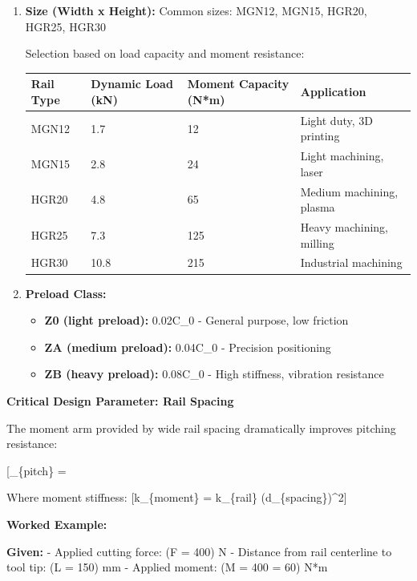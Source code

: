\documentclass[
]{article}
\providecommand{\tightlist}{%
  \setlength{\itemsep}{0pt}\setlength{\parskip}{0pt}}
\begin{document}
\begin{enumerate}
\def\labelenumi{\arabic{enumi}.}
\item
  \textbf{Size (Width x Height):} Common sizes: MGN12, MGN15, HGR20,
  HGR25, HGR30

  Selection based on load capacity and moment resistance:

  {\def\LTcaptype{} %
  \begin{longtable}[]{@{}llll@{}}
  \toprule\noalign{}
  Rail Type & Dynamic Load (kN) & Moment Capacity (N*m) & Application \\
  \midrule\noalign{}
  \endhead
  \bottomrule\noalign{}
  \endlastfoot
  MGN12 & 1.7 & 12 & Light duty, 3D printing \\
  MGN15 & 2.8 & 24 & Light machining, laser \\
  HGR20 & 4.8 & 65 & Medium machining, plasma \\
  HGR25 & 7.3 & 125 & Heavy machining, milling \\
  HGR30 & 10.8 & 215 & Industrial machining \\
  \end{longtable}
  }
\item
  \textbf{Preload Class:}

  \begin{itemize}
  \tightlist
  \item
    \textbf{Z0 (light preload):} 0.02C\_0 - General purpose, low
    friction
  \item
    \textbf{ZA (medium preload):} 0.04C\_0 - Precision positioning
  \item
    \textbf{ZB (heavy preload):} 0.08C\_0 - High stiffness, vibration
    resistance
  \end{itemize}
\end{enumerate}

\textbf{Critical Design Parameter: Rail Spacing}

The moment arm provided by wide rail spacing dramatically improves
pitching resistance:

{[}\theta\_\{pitch\} = \frac{M_{applied}}{k_{moment}}{]}

Where moment stiffness: {[}k\_\{moment\} = k\_\{rail\}
\times (d\_\{spacing\})\^{}2{]}

\textbf{Worked Example:}

\textbf{Given:} - Applied cutting force: (F = 400) N - Distance from
rail centerline to tool tip: (L = 150) mm - Applied moment: (M = 400
 = 60) N*m
\end{document}
